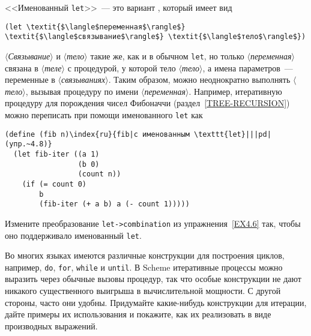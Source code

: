 \begin{exercise}{4.8}%
\label{EX4.8}%
%
%
%
%
<<Именованный {\tt let}>>~--- это вариант
, который имеет вид

\begin{Verbatim}[fontsize=\small]
(let \textit{$\langle$переменная$\rangle$} \textit{$\langle$связывание$\rangle$} \textit{$\langle$тело$\rangle$})
\end{Verbatim}
\textit{$\langle$Связывание$\rangle$} и \textit{$\langle$тело$\rangle$} такие 
же, как и в
обычном {\tt let}, но только \textit{$\langle$переменная$\rangle$}
связана в \textit{$\langle$теле$\rangle$} с процедурой, у которой тело
\textit{$\langle$тело$\rangle$}, а имена параметров~--- переменные в
\textit{$\langle$связываниях$\rangle$}.  Таким образом, можно неоднократно
выполнять \textit{$\langle$тело$\rangle$}, вызывая процедуру по имени
\textit{$\langle$переменная$\rangle$}.  Например, итеративную процедуру для
порождения чисел Фибоначчи (раздел~\ref{TREE-RECURSION})
можно переписать при помощи именованного {\tt let} как

\begin{Verbatim}[fontsize=\small]
(define (fib n)\index{ru}{fib|с именованным \texttt{let}|||pd|(упр.~4.8)}
  (let fib-iter ((a 1)
                 (b 0)
                 (count n))
    (if (= count 0)
        b
        (fib-iter (+ a b) a (- count 1)))))
\end{Verbatim}
Измените преобразование {\tt let->combination} из 
упражнения~\ref{EX4.6} так, чтобы оно поддерживало именованный
{\tt let}.
\end{exercise}

\begin{exercise}{4.9}%
\label{EX4.9}%
Во многих языках имеются
различные конструкции для
построения циклов, например, {\tt do}, {\tt for},
{\tt while} и {\tt until}.  В Scheme итеративные
процессы можно выразить через обычные вызовы процедур, так что особые
конструкции не дают никакого существенного выигрыша в вычислительной
мощности.  С другой стороны, часто они удобны.  Придумайте
какие-нибудь конструкции для итерации, дайте примеры их
использования и покажите, как их реализовать в виде производных
выражений.
\end{exercise}

